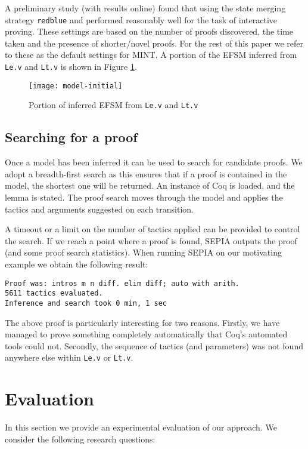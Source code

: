 \documentclass{llncs}
\begin{document}
A preliminary study (with results online) found that using the state merging strategy \texttt{redblue} and  performed reasonably well for the task of interactive proving. These settings are based on the number of proofs discovered, the time taken and the presence of shorter/novel proofs. For the rest of this paper we refer to these as the default settings for MINT. A portion of the EFSM inferred from {\tt Le.v} and {\tt Lt.v} is shown in Figure \ref{fig:efsmexample}.

\begin{figure}[H]
\centering
\texttt{[image: model-initial]}
\caption{Portion of inferred EFSM from {\tt Le.v} and {\tt Lt.v}}
\label{fig:efsmexample}
\end{figure}

\subsection{Searching for a proof}
Once a model has been inferred it can be used to search for candidate proofs. We adopt a breadth-first search as this ensures that if a proof is contained in the model, the shortest one will be returned. An instance of Coq is loaded, and the lemma is stated. The proof search moves through the model and applies the tactics and arguments suggested on each transition. 

A timeout or a limit on the number of tactics applied can be provided to control the search. If we reach a point where a proof is found, SEPIA outputs the proof (and some proof search statistics). When running SEPIA on our motivating example we obtain the following result:

\begin{lstlisting}
Proof was: intros m n diff. elim diff; auto with arith.
5611 tactics evaluated.
Inference and search took 0 min, 1 sec
\end{lstlisting}

The above proof is particularly interesting for two reasons. Firstly, we have managed to prove something completely automatically that Coq's automated tools could not. Secondly, the sequence of tactics (and parameters) was not found anywhere else within \texttt{Le.v} or \texttt{Lt.v}.

\section{Evaluation}
\label{sec:eval}
In this section we provide an experimental evaluation of our approach. We consider the following research questions:
\end{document}
